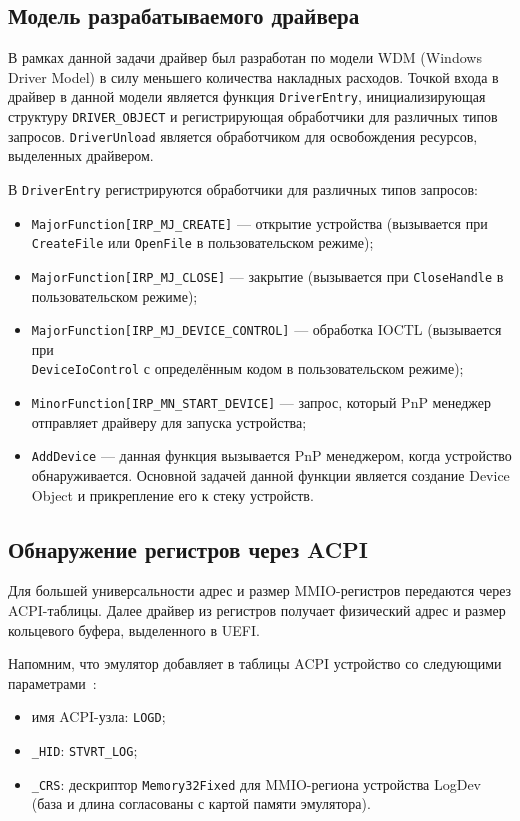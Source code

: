 \subsection{Модель разрабатываемого драйвера}

В рамках данной задачи драйвер был разработан по модели WDM (Windows Driver Model) в силу меньшего количества накладных расходов. Точкой входа в драйвер в данной модели является функция \texttt{DriverEntry}, инициализирующая структуру \texttt{DRIVER\_OBJECT} и регистрирующая обработчики для различных типов запросов. \texttt{DriverUnload} является обработчиком для освобождения ресурсов, выделенных драйвером.

В \texttt{DriverEntry} регистрируются обработчики для различных типов запросов:
\begin{itemize}
    \item \texttt{MajorFunction[IRP\_MJ\_CREATE]} --- открытие устройства (вызывается при \texttt{CreateFile} или \texttt{OpenFile} в пользовательском режиме);
    \item \texttt{MajorFunction[IRP\_MJ\_CLOSE]} --- закрытие (вызывается при \texttt{CloseHandle} в пользовательском режиме);
    \item \texttt{MajorFunction[IRP\_MJ\_DEVICE\_CONTROL]} --- обработка IOCTL (вызывается при \\ \texttt{DeviceIoControl} с определённым кодом в пользовательском режиме);
    \item \texttt{MinorFunction[IRP\_MN\_START\_DEVICE]} --- запрос, который PnP менеджер отправляет драйверу для запуска устройства;
    \item \texttt{AddDevice} --- данная функция вызывается PnP менеджером, когда устройство обнаруживается. Основной задачей данной функции является создание Device Object и прикрепление его к стеку устройств.
\end{itemize}

\subsection{Обнаружение регистров через ACPI}
\label{sec:acpi-logdev}

Для большей универсальности адрес и размер MMIO-регистров передаются через ACPI-таблицы. Далее драйвер из регистров получает физический адрес и размер кольцевого буфера, выделенного в UEFI.

Напомним, что эмулятор добавляет в таблицы ACPI устройство со следующими параметрами~\cite{stratovirt_repo}:
\begin{itemize}
    \item имя ACPI-узла: \texttt{LOGD};
    \item \texttt{\_HID}: \texttt{STVRT\_LOG};
    \item \texttt{\_CRS}: дескриптор \texttt{Memory32Fixed} для MMIO-региона
    устройства LogDev (база и длина согласованы с картой памяти эмулятора).
\end{itemize}

